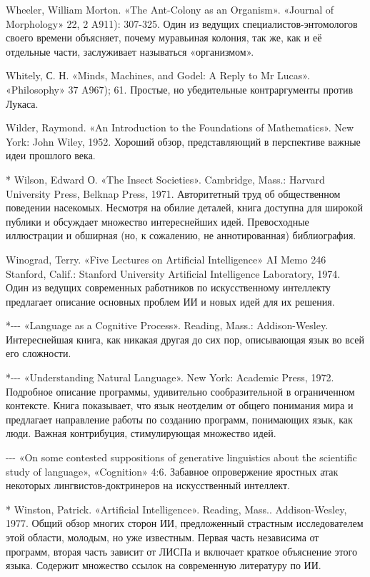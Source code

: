 Wheeler, William Morton. «The Ant-Colony as an Organism». «Journal of Morphology» 22, 2 A911): 307-325. Один из ведущих специалистов-энтомологов своего времени объясняет, почему муравьиная колония, так же, как и её отдельные части, заслуживает называться «организмом».

Whitely, С. Н. «Minds, Machines, and Godel: A Reply to Mr Lucas». «Philosophy» 37 A967); 61. Простые, но убедительные контраргументы против Лукаса.

Wilder, Raymond. «An Introduction to the Foundations of Mathematics». New York: John Wiley, 1952. Хороший обзор, представляющий в перспективе важные идеи прошлого века.

* Wilson, Edward О. «The Insect Societies». Cambridge, Mass.: Harvard University Press, Belknap Press, 1971. Авторитетный труд об общественном поведении насекомых. Несмотря на обилие деталей, книга доступна для широкой публики и обсуждает множество интереснейших идей. Превосходные иллюстрации и обширная (но, к сожалению, не аннотированная) библиография.

Winograd, Terry. «Five Lectures on Artificial Intelligence» AI Memo 246 Stanford, Calif.: Stanford University Artificial Intelligence Laboratory, 1974. Один из ведущих современных работников по искусственному интеллекту предлагает описание основных проблем ИИ и новых идей для их решения.

*-\/-\/- «Language as a Cognitive Process». Reading, Mass.: Addison-Wesley. Интереснейшая книга, как никакая другая до сих пор, описывающая язык во всей его сложности.

*-\/-\/- «Understanding Natural Language». New York: Academic Press, 1972. Подробное описание программы, удивительно сообразительной в ограниченном контексте. Книга показывает, что язык неотделим от общего понимания мира и предлагает направление работы по созданию программ, понимающих язык, как люди. Важная контрибуция, стимулирующая множество идей.

-\/-\/- «On some contested suppositions of generative linguistics about the scientific study of language», «Cognition» 4:6. Забавное опровержение яростных атак некоторых лингвистов-доктринеров на искусственный интеллект.

* Winston, Patrick. «Artificial Intelligence». Reading, Mass.. Addison-Wesley, 1977. Общий обзор многих сторон ИИ, предложенный страстным исследователем этой области, молодым, но уже известным. Первая часть независима от программ, вторая часть зависит от ЛИСПа и включает краткое объяснение этого языка. Содержит множество ссылок на современную литературу по ИИ.

